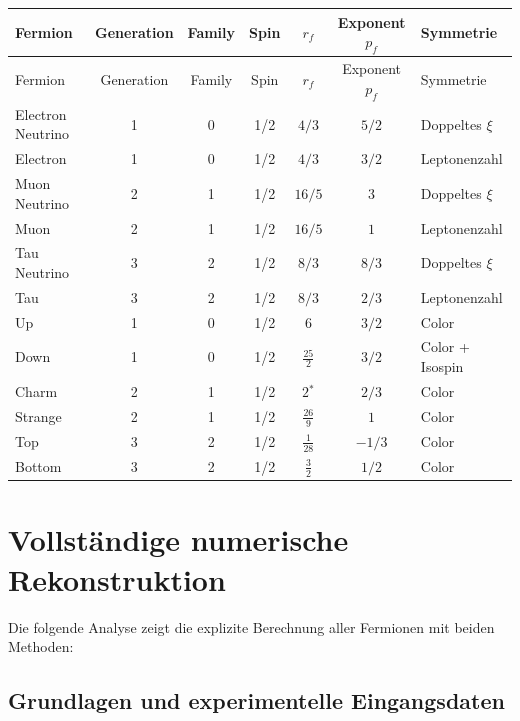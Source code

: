 	\begin{longtable}{|l|c|c|c|c|c|l|}
		\hline
		Fermion & Generation & Family & Spin & $r_f$ & Exponent $p_f$ & Symmetrie \\
		\hline
		\endfirsthead
		\hline
		Fermion & Generation & Family & Spin & $r_f$ & Exponent $p_f$ & Symmetrie \\
		\hline
		\endhead
		Electron Neutrino & 1 & 0 & 1/2 & $4/3$ & $5/2$ & Doppeltes $\xi$ \\
		Electron          & 1 & 0 & 1/2 & $4/3$  & $3/2$ & Leptonenzahl \\
		Muon Neutrino     & 2 & 1 & 1/2 & $16/5$ & $3$   & Doppeltes $\xi$ \\
		Muon              & 2 & 1 & 1/2 & $16/5$ & $1$   & Leptonenzahl \\
		Tau Neutrino      & 3 & 2 & 1/2 & $8/3$ & $8/3$ & Doppeltes $\xi$ \\
		Tau               & 3 & 2 & 1/2 & $8/3$  & $2/3$ & Leptonenzahl \\
		\hline
		Up     & 1 & 0 & 1/2 & $6$          & $3/2$ & Color \\
		Down   & 1 & 0 & 1/2 & $\tfrac{25}{2}$ & $3/2$ & Color + Isospin \\
		Charm  & 2 & 1 & 1/2 & $2$$^*$          & $2/3$ & Color \\
		Strange& 2 & 1 & 1/2 & $\tfrac{26}{9}$ & $1$   & Color \\
		Top    & 3 & 2 & 1/2 & $\tfrac{1}{28}$ & $-1/3$ & Color \\
		Bottom & 3 & 2 & 1/2 & $\tfrac{3}{2}$  & $1/2$ & Color \\
		\hline
	\end{longtable}
	
	
	\section{Vollständige numerische Rekonstruktion}
	\label{sec:vollstaendige_rekonstruktion}
	
	Die folgende Analyse zeigt die explizite Berechnung aller Fermionen mit beiden Methoden:
	
	\subsection{Grundlagen und experimentelle Eingangsdaten}
	\label{subsec:grundlagen}
	
